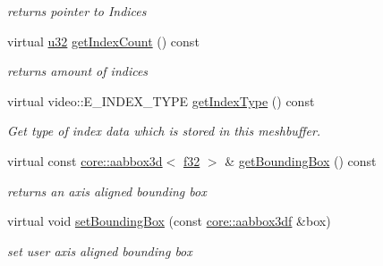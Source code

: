 \begin{DoxyCompactItemize}
\begin{DoxyCompactList}\small\item\em returns pointer to Indices \end{DoxyCompactList}\item 
\mbox{\label{structirr_1_1scene_1_1SSharedMeshBuffer_a97a95470c8956fc0120466e57698081a}} 
virtual \hyperlink{namespaceirr_a0416a53257075833e7002efd0a18e804}{u32} \hyperlink{structirr_1_1scene_1_1SSharedMeshBuffer_a97a95470c8956fc0120466e57698081a}{get\+Index\+Count} () const
\begin{DoxyCompactList}\small\item\em returns amount of indices \end{DoxyCompactList}\item 
\mbox{\label{structirr_1_1scene_1_1SSharedMeshBuffer_af9d02a1f61c5498cbe21be8185d1c803}} 
virtual video\+::\+E\+\_\+\+I\+N\+D\+E\+X\+\_\+\+T\+Y\+PE \hyperlink{structirr_1_1scene_1_1SSharedMeshBuffer_af9d02a1f61c5498cbe21be8185d1c803}{get\+Index\+Type} () const
\begin{DoxyCompactList}\small\item\em Get type of index data which is stored in this meshbuffer. \end{DoxyCompactList}\item 
\mbox{\label{structirr_1_1scene_1_1SSharedMeshBuffer_a5a736dee60a5f5ebc929dc03c0763082}} 
virtual const \hyperlink{classirr_1_1core_1_1aabbox3d}{core\+::aabbox3d}$<$ \hyperlink{namespaceirr_a0277be98d67dc26ff93b1a6a1d086b07}{f32} $>$ \& \hyperlink{structirr_1_1scene_1_1SSharedMeshBuffer_a5a736dee60a5f5ebc929dc03c0763082}{get\+Bounding\+Box} () const
\begin{DoxyCompactList}\small\item\em returns an axis aligned bounding box \end{DoxyCompactList}\item 
\mbox{\label{structirr_1_1scene_1_1SSharedMeshBuffer_a54e11fd284245c3f5e5e07145ad4a202}} 
virtual void \hyperlink{structirr_1_1scene_1_1SSharedMeshBuffer_a54e11fd284245c3f5e5e07145ad4a202}{set\+Bounding\+Box} (const \hyperlink{namespaceirr_1_1core_adfc8fa01b30044c55f3332a1d6c1aa19}{core\+::aabbox3df} \&box)
\begin{DoxyCompactList}\small\item\em set user axis aligned bounding box \end{DoxyCompactList}\item 

\end{DoxyCompactItemize}

